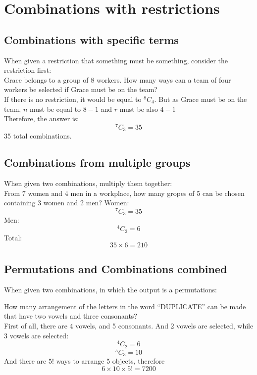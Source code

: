\documentclass{book}
\newcommand{\Comb}[2]{{}^{#1}C_{#2}}
\begin{document}
\section{Combinations with restrictions}
\subsection{Combinations with specific terms}
When given a restriction that something must be something, consider the restriction first:\\

Grace belongs to a group of 8 workers.  How many ways can a team of four workers be selected if Grace must be on the team?\\
If there is no restriction, it would be equal to $\Comb{8}{4}$.  But as Grace must be on the team, $n$ must be equal to $8 - 1$ and $r$ must be also $4 - 1$\\
Therefore, the answer is:
\[
	\Comb{7}{3} = 35
\]
35 total combinations.

\subsection{Combinations from multiple groups}
When given two combinations, multiply them together:\\

From 7 women and 4 men in a workplace, how many gropes of 5 can be chosen containing 3 women and 2 men?
Women:
\[
	\Comb{7}{3} = 35
\]
Men:
\[
	\Comb{4}{2} = 6
\]
Total:
\[
	35 \times 6 = 210
\]

\subsection{Permutations and Combinations combined}
When given two combinations, in which the output is a permutations:

How many arrangement of the letters in the word ``DUPLICATE'' can be made that have two vowels and three consonants?\\

First of all, there are 4 vowels, and 5 consonants.  And 2 vowels are selected, while 3 vowels are selected:
\[
	\Comb{4}{2} = 6
\]
\[
	\Comb{5}{3} = 10
\]
And there are $5!$ ways to arrange 5 objects, therefore
\[
	6 \times 10 \times 5! = 7200
\]
\end{document}
